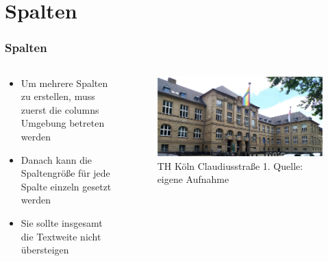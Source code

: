 \documentclass{beamer}
\begin{document}
\section{Spalten}\label{sec:columns}
\begin{frame} 
    \frametitle{Spalten} 
    \begin{columns}
        \begin{column}{0.5\textwidth}
            \begin{itemize}
                \item Um mehrere Spalten zu erstellen, muss zuerst die columns Umgebung betreten werden
                \item Danach kann die Spaltengröße für jede Spalte einzeln gesetzt werden
                \item Sie sollte insgesamt die Textweite nicht übersteigen
            \end{itemize}
        \end{column}
        \begin{column}{0.5\textwidth}
            \begin{center}
                \begin{figure}\label{thk-claudiusstr}
                    \includegraphics[width=\textwidth]{figures/thk.jpg}
                    \caption[TH Köln Claudiusstr.]{TH Köln Claudiusstraße 1. Quelle: eigene Aufnahme}
                \end{figure}
            \end{center}
        \end{column}    
    \end{columns}
    
    
\end{frame}
\end{document}

